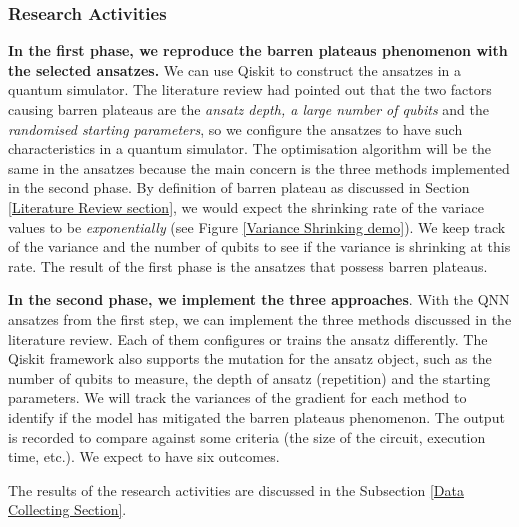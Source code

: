 \subsubsection{Research Activities} \label{Research Activities section}
\textbf{In the first phase, we reproduce the barren plateaus phenomenon with the selected ansatzes.}
We can use Qiskit \cite{Qiskit} to construct the ansatzes in a quantum simulator.
The literature review had pointed out that the two factors causing barren plateaus are the \textit{ansatz depth, a large number of qubits} and the \textit{randomised starting parameters}, so we configure the ansatzes to have such characteristics in a quantum simulator.
The optimisation algorithm will be the same in the ansatzes because the main concern is the three methods implemented in the second phase.
By definition of barren plateau as discussed in Section \ref{Literature Review section}, we would expect the shrinking rate of the variace values to be \textit{exponentially} (see Figure \ref{Variance Shrinking demo}).
We keep track of the variance and the number of qubits to see if the variance is shrinking at this rate.
The result of the first phase is the ansatzes that possess barren plateaus.

\textbf{In the second phase, we implement the three approaches}.
With the QNN ansatzes from the first step, we can implement the three methods discussed in the literature review.
Each of them configures or trains the ansatz differently.
The Qiskit framework also supports the mutation for the ansatz object, such as the number of qubits to measure, the depth of ansatz (repetition) and the starting parameters.
We will track the variances of the gradient for each method to identify if the model has mitigated the barren plateaus phenomenon.
The output is recorded to compare against some criteria (the size of the circuit, execution time, etc.).
We expect to have six outcomes.

The results of the research activities are discussed in the Subsection \ref{Data Collecting Section}.

